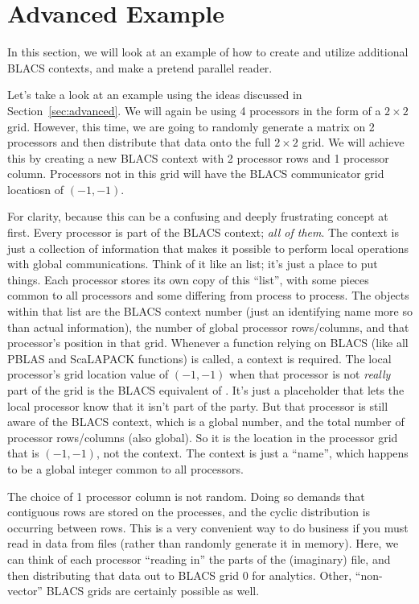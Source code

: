 \section[]{Advanced Example}\label{sec:eg2}

In this section, we will look at an example of how to create and utilize additional BLACS contexts, and make a pretend parallel reader.

Let's take a look at an example using the ideas discussed in Section~\ref{sec:advanced}.  We will again be using 4 processors in the form of a $2\times 2$ grid.  However, this time, we are going to randomly generate a matrix on 2 processors and then distribute that data onto the full $2\times 2$ grid.  We will achieve this by creating a new BLACS context with 2 processor rows and 1 processor column.  Processors not in this grid will have the BLACS communicator grid locatiosn of $(-1, -1)$. 

For clarity, because this can be a confusing and deeply frustrating concept at first.  Every processor is part of the BLACS context; \emph{all of them}.  The context is just a collection of information that makes it possible to perform local operations with global communications.  Think of it like an  list; it's just a place to put things.  Each processor stores its own copy of this ``list'', with some pieces common to all processors and some differing from process to process.  The objects within that list are the BLACS context number (just an identifying name more so than actual information), the number of global processor rows/columns, and that processor's position in that grid.  Whenever a function relying on BLACS (like all PBLAS and ScaLAPACK functions) is called, a context is required.  The local processor's grid location value of $(-1, -1)$ when that processor is not \emph{really} part of the grid is the BLACS equivalent of .  It's just a placeholder that lets the local 
processor know that it isn't part of the party.  But that processor is still aware of the BLACS context, which is a global number, and the total number of processor rows/columns (also global).  So it is the location in the processor grid that is $(-1, -1)$, not the context.  The context is just a ``name'', which happens to be a global integer common to all processors.

The choice of 1 processor column is not random.  Doing so demands that contiguous rows are stored on the processes, and the cyclic distribution is occurring between rows.  This is a very convenient way to do business if you must read in data from files (rather than randomly generate it in memory).  Here, we can think of each processor ``reading in'' the parts of the (imaginary) file, and then distributing that data out to BLACS grid 0 for analytics.  Other, ``non-vector'' BLACS grids are certainly possible as well.


